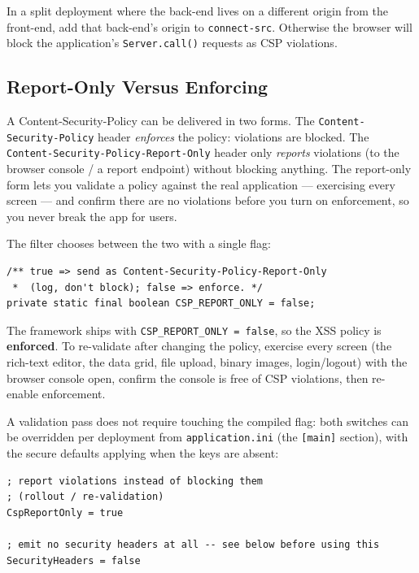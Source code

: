 \begin{notebox}
In a split deployment where the back-end lives on a different origin from the front-end, add that back-end's origin to \texttt{connect-src}.  Otherwise the browser will block the application's \texttt{Server.call()} requests as CSP violations.
\end{notebox}

\subsection{Report-Only Versus Enforcing}
\label{sec:security-rollout}

A Content-Security-Policy can be delivered in two forms.  The \texttt{Content-Security-Policy} header \emph{enforces} the policy: violations are blocked.  The \texttt{Content-Security-Policy-Report-Only} header only \emph{reports} violations (to the browser console / a report endpoint) without blocking anything.  The report-only form lets you validate a policy against the real application --- exercising every screen --- and confirm there are no violations before you turn on enforcement, so you never break the app for users.

The filter chooses between the two with a single flag:

\begin{lstlisting}[style=java]
/** true => send as Content-Security-Policy-Report-Only
 *  (log, don't block); false => enforce. */
private static final boolean CSP_REPORT_ONLY = false;
\end{lstlisting}

\noindent
The framework ships with \texttt{CSP\_REPORT\_ONLY = false}, so the XSS policy is \textbf{enforced}.  To re-validate after changing the policy, exercise every screen (the rich-text editor, the data grid, file upload, binary images, login/logout) with the browser console open, confirm the console is free of CSP violations, then re-enable enforcement.

A validation pass does not require touching the compiled flag: both switches can be overridden per deployment from \texttt{application.ini} (the \texttt{[main]} section), with the secure defaults applying when the keys are absent:

\begin{lstlisting}[style=ini]
; report violations instead of blocking them
; (rollout / re-validation)
CspReportOnly = true

; emit no security headers at all -- see below before using this
SecurityHeaders = false
\end{lstlisting}

